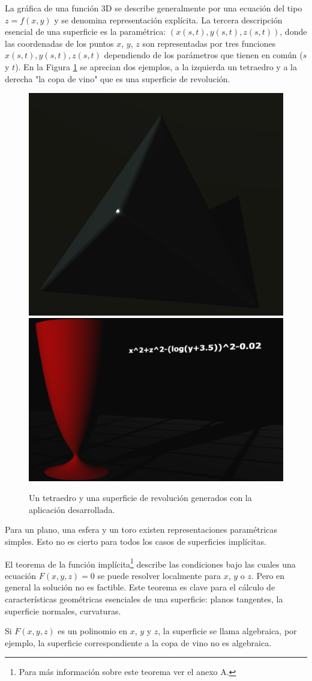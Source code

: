 \documentclass[12pt]{article}
\begin{document}
La gráfica de una función 3D se describe generalmente por una ecuación del tipo $z = f (x, y)$ y se denomina  representación explícita\cite{implicitas}\cite{realtimerendering}. La tercera descripción esencial de una superficie es la paramétrica: $(x(s, t), y (s, t), z (s, t))$, donde las coordenadas de los puntos $x$, $y$, $z$ son representadas por tres funciones $x(s, t), y(s, t) , z(s, t)$ dependiendo de los parámetros que tienen en común ($s$ y $t$). En la Figura \ref{ejemplosFiguras} se aprecian dos ejemplos, a la izquierda un tetraedro y a la derecha "la copa de vino" que es una superficie de revolución.
\begin{figure}[ht]
\includegraphics[width =0.45\linewidth]{tetraedro.png}
\hfill
\includegraphics[width =0.45\linewidth]{copa.png}
\caption{ Un tetraedro y una superficie de revolución generados con la aplicación desarrollada.}
\label{ejemplosFiguras}
\end{figure}

Para un plano, una esfera y un toro existen representaciones paramétricas simples. Esto no es cierto para todos los casos de superficies implícitas.

El teorema de la función implícita\footnote{Para más información sobre este teorema ver el anexo A.} describe las condiciones bajo las cuales una ecuación $F (x, y, z) = 0$ se puede resolver localmente para $x$, $y$ o $z$. Pero en general la solución no es factible. Este teorema es clave para el cálculo de características geométricas esenciales de una superficie: planos tangentes, la superficie normales, curvaturas.

Si $F (x, y, z)$ es un polinomio en $x$, $y$ y $z$, la superficie se llama algebraica,  por ejemplo, la superficie correspondiente a la copa de vino no es algebraica.
\end{document}
